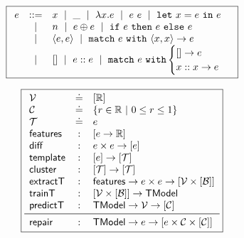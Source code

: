 \begin{figure}
\small
\centering
\begin{minipage}[c]{\linewidth}
  \[
  \boxed{
  \begin{array}{rcl}
  e & ::=    & x \ \mid\  \_  \ \mid\  \lambda x. e \ \mid\  e\ e \ \mid\  \mathtt{let}\ x = e\ \mathtt{in}\ e \\
    & \ \mid\  & n \ \mid\  e \oplus e \ \mid\  \mathtt{if}\ e\ \mathtt{then}\ e\ \mathtt{else}\ e \\
    & \ \mid\  & \langle e, e \rangle \ \mid\  \mathtt{match}\ e\ \mathtt{with}\ \langle x, x \rangle \to e \\
    & \ \mid\  & \mathtt{[]} \ \mid\  e :: e \ \mid\  \mathtt{match}\ e\ \mathtt{with} \begin{cases} \mathtt{[]} \to e\\ x :: x \to e \end{cases} \\[0.05in]
  \end{array}
  }
  \]
  \label{fig:syntax}
\end{minipage}
\begin{minipage}[c]{\linewidth}
  \lstDeleteShortInline{|} %
  \[
  \boxed{
  \begin{array}{lcl}
    \V           & \defeq & \List{\R}\\
    \Runit       & \defeq & \{r \in \R\ |\ 0 \le r \le 1\} \\ %
    \T           & \defeq & e\\
    \featuresym  & : & \List{e \to \R} \\
    \diffsym     & : & e \times e \to \List{e} \\
    \templatesym & : & \List{e} \to \List{\T}\\
    \clustersym  & : & \List{\T} \to \List{\T}\\
    \extractTsym & : & \featuresym \to e \times e \to \List{\V \times \List{\B}} \\
    \trainTsym   & : & \List{\V \times \List{\B}} \to \ModelT \\
    \predictTsym & : & \ModelT \to \V \to \List{\Runit} \\
    \midrule
    \repairsym   & : & \ModelT \to e \to \List{e \times \Runit \times \List{\Runit}}
  \end{array}
  }
  \]
  \lstMakeShortInline{|}
  \label{fig:api}
\end{minipage}
\end{figure}
